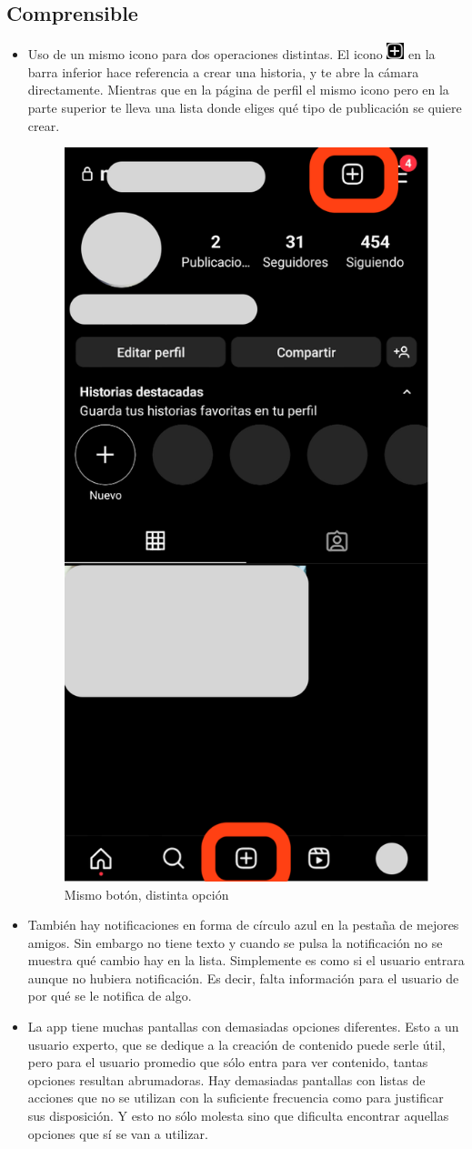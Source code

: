 \documentclass{article}
\begin{document}
\subsection{Comprensible}
\begin{itemize}
    \item Uso de un mismo icono para dos operaciones distintas. El icono \includegraphics[width=5mm]{3 puntos.png}
 en la barra inferior hace referencia a crear una historia, y te abre la cámara directamente. Mientras que en la página de perfil el mismo icono pero en la parte superior te lleva una lista donde eliges qué tipo de publicación se quiere crear.
    \begin{figure}[!h]
        \centering
        \includegraphics[width=0.20\linewidth]{img16.png}
        \caption{Mismo botón, distinta opción}
    \end{figure}
    \item También hay notificaciones en forma de círculo azul en la pestaña de mejores amigos. Sin embargo no tiene texto y cuando se pulsa la notificación no se muestra qué cambio hay en la lista. Simplemente es como si el usuario entrara aunque no hubiera notificación. Es decir, falta información para el usuario de por qué se le notifica de algo.
    \item La app tiene muchas pantallas con demasiadas opciones diferentes. Esto a un usuario experto, que se dedique a la creación de contenido puede serle útil, pero para el usuario promedio que sólo entra para ver contenido, tantas opciones resultan abrumadoras. Hay demasiadas pantallas con listas de acciones que no se utilizan con la suficiente frecuencia como para justificar sus disposición. Y esto no sólo molesta sino que dificulta encontrar aquellas opciones que sí se van a utilizar.
    \newline
\newline
\newline

\end{itemize}
\end{document}
